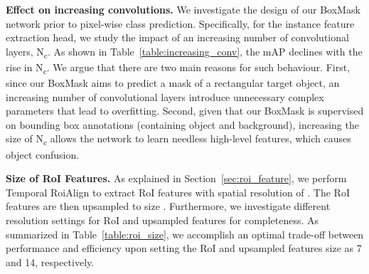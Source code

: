 \documentclass[10pt,twocolumn,letterpaper]{article}
\begin{document}
\vspace{3pt}
\noindent \textbf{Effect on increasing convolutions.}
\label{sec:ablation_num_conv}
We investigate the design of our BoxMask network prior to pixel-wise class prediction. Specifically, for the instance feature extraction head, we study the impact of an increasing number of  convolutional layers, N\textsubscript{c}. As shown in Table~\ref{table:increasing_conv}, the mAP declines with the rise in N\textsubscript{c}. We argue that there are two main reasons for such behaviour.
First, since our BoxMask aims to predict a mask of a rectangular target object, an increasing number of convolutional layers introduce unnecessary complex parameters that lead to overfitting. Second, given that our BoxMask is supervised on bounding box annotations (containing object and background), increasing the size of N\textsubscript{c} allows the network to learn needless high-level features, which causes object confusion.


\vspace{3pt}
\noindent \textbf{Size of RoI Features.}
As explained in Section~\ref{sec:roi_feature}, we perform Temporal RoiAlign to extract RoI features with spatial resolution of . The RoI features are then upsampled to size . Furthermore, we investigate different resolution settings for RoI and upsampled features for completeness. As summarized in Table~\ref{table:roi_size}, we accomplish an optimal trade-off between performance and efficiency upon setting the RoI and upsampled features size as 7 and 14, respectively.
\end{document}
